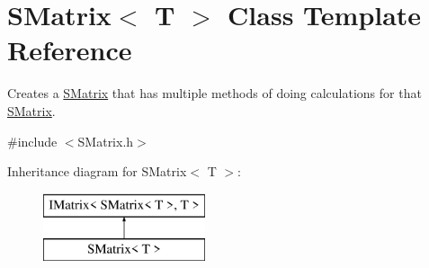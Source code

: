 \hypertarget{class_s_matrix}{}\section{S\+Matrix$<$ T $>$ Class Template Reference}
\label{class_s_matrix}


Creates a \mbox{\hyperlink{class_s_matrix}{S\+Matrix}} that has multiple methods of doing calculations for that \mbox{\hyperlink{class_s_matrix}{S\+Matrix}}.  




{\ttfamily \#include $<$S\+Matrix.\+h$>$}

Inheritance diagram for S\+Matrix$<$ T $>$\+:\begin{figure}[H]
\begin{center}
\leavevmode
\includegraphics[height=2.000000cm]{class_s_matrix}
\end{center}
\end{figure}
